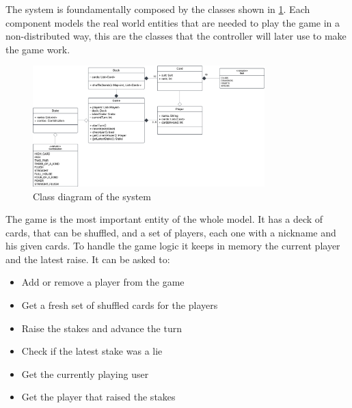 \documentclass{scrartcl}
\begin{document}
The system is foundamentally composed by the classes shown in \cref{fig:classes}. \newline
Each component models the real world entities that are needed to play the game in a non-distributed
way, this are the classes that the controller will later use to make the game work.
\begin{figure}[H]
  \centering
  \includegraphics[width=0.8\textwidth]{figures/classes.png}
  \caption{Class diagram of the system} 
  \label{fig:classes}
\end{figure}

The game is the most important entity of the whole model. It has a deck of cards, that can be shuffled,
and a set of players, each one with a nickname and his given cards. 
To handle the game logic it keeps in memory the current player and the latest raise. \newline
It can be asked to:
\begin{itemize}
  \item Add or remove a player from the game
  \item Get a fresh set of shuffled cards for the players
  \item Raise the stakes and advance the turn
  \item Check if the latest stake was a lie
  \item Get the currently playing user
  \item Get the player that raised the stakes
\end{itemize}
\end{document}
